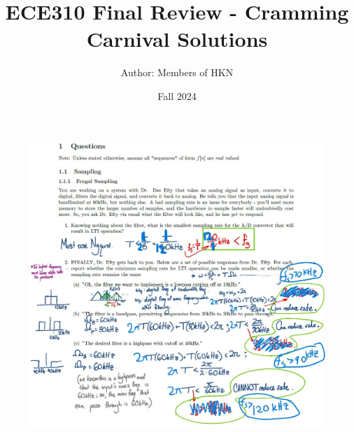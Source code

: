 \documentclass{article}
\title{ECE310 Final Review - Cramming Carnival Solutions}
\author{Author: Members of HKN}
\date{Fall 2024}
\begin{document}
\maketitle

\begin{figure}[h]
\begin{center}
    \includegraphics[width=0.96 \textwidth]{figures/Solutions pg 1.jpg}
    \label{fig:old_solutions_1}
\end{center}
\end{figure}

\newpage
\end{document}
